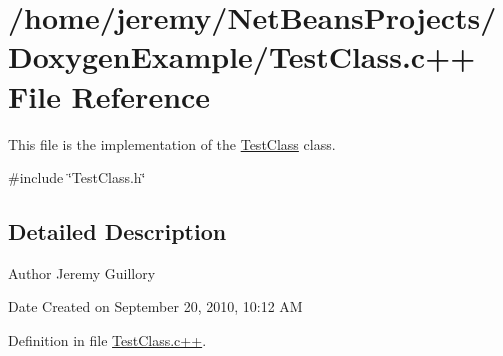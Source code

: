 \hypertarget{_test_class_8c_09_09}{
\section{/home/jeremy/NetBeansProjects/DoxygenExample/TestClass.c++ File Reference}
\label{_test_class_8c_09_09}
}


This file is the implementation of the \hyperlink{class_test_class}{TestClass} class.  


{\ttfamily \#include \char`\"{}TestClass.h\char`\"{}}\par


\subsection{Detailed Description}
\begin{DoxyAuthor}{Author}
Jeremy Guillory 
\end{DoxyAuthor}
\begin{DoxyDate}{Date}
Created on September 20, 2010, 10:12 AM 
\end{DoxyDate}


Definition in file \hyperlink{_test_class_8c_09_09_source}{TestClass.c++}.

